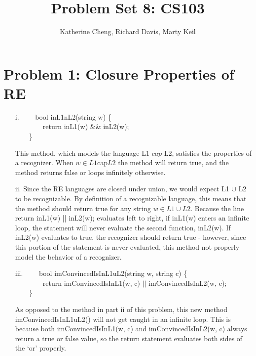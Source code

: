 \documentclass[10pt,letter]{article}
\begin{document}

\title{Problem Set 8: CS103}

\author{Katherine Cheng, Richard Davis, Marty Keil}

 
\maketitle

\section*{Problem 1: Closure Properties of RE}

\begin{enumerate}
\item[i.] 
{\selectfont
$\qquad$bool inL1nL2(string w) \{\\
$\qquad$$\qquad$return inL1(w) \&\& inL2(w);\\
$\qquad$\}
}

This method, which models the language L1 $cap$ L2, satisfies the properties of a recognizer. When $w \in L1 $cap$ L2$ the method will return true, and the method returns false or loops infinitely otherwise.
\item[ii.] Since the RE languages are closed under union, we would expect L1 $\cup$ L2 to be recognizable. By definition of a recognizable language, this means that the method should return true for any string $w \in L1 \cup L2$. Because the line {\selectfont return inL1(w) || inL2(w);} evaluates left to right, if {\selectfont inL1(w)} enters an infinite loop, the statement will never evaluate the second function, {\selectfont inL2(w)}. If {\selectfont inL2(w)} evaluates to true, the recognizer should return true - however, since this portion of the statement is never evaluated, this method not properly model the behavior of a recognizer.
\item[iii.] 
{\selectfont
$\qquad$bool imConvincedIsInL1uL2(string w, string c) \{\\
$\qquad$$\qquad$return imConvincedIsInL1(w, c) $||$  imConvincedIsInL2(w, c);\\
$\qquad$\}
}

As opposed to the method in part ii of this problem, this new method {\selectfont imConvincedIsInL1uL2()} will not get caught in an infinite loop. This is because both {\selectfont imConvincedIsInL1(w, c)} and {\selectfont imConvincedIsInL2(w, c)} always return a true or false value, so the return statement evaluates both sides of the `or' properly.
\end{enumerate}
\end{document}
